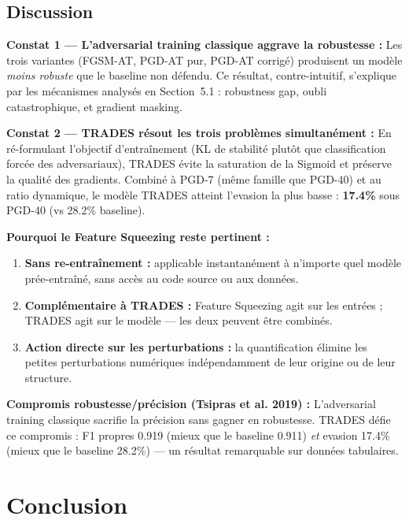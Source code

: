 \documentclass[11pt,a4paper]{article}
\begin{document}
\subsection{Discussion}

\textbf{Constat 1 --- L'adversarial training classique aggrave la robustesse :}
Les trois variantes (FGSM-AT, PGD-AT pur, PGD-AT corrig\'e) produisent un mod\`ele
\emph{moins robuste} que le baseline non d\'efendu.
Ce r\'esultat, contre-intuitif, s'explique par les m\'ecanismes analys\'es en Section~5.1 :
robustness gap, oubli catastrophique, et gradient masking.

\textbf{Constat 2 --- TRADES r\'esout les trois probl\`emes simultan\'ement :}
En r\'e-formulant l'objectif d'entra\^inement (KL de stabilit\'e plut\^ot que classification
forc\'ee des adversariaux), TRADES \'evite la saturation de la Sigmoid et pr\'eserve la qualit\'e
des gradients. Combin\'e \`a PGD-7 (m\^eme famille que PGD-40) et au ratio dynamique, le mod\`ele
TRADES atteint l'evasion la plus basse : \textbf{17.4\%} sous PGD-40 (vs 28.2\% baseline).

\textbf{Pourquoi le Feature Squeezing reste pertinent :}

\begin{enumerate}[leftmargin=1.5em]
    \item \textbf{Sans re-entra\^inement :} applicable instantan\'ement \`a n'importe quel mod\`ele
    pr\'ee-entra\^in\'e, sans acc\`es au code source ou aux donn\'ees.
    \item \textbf{Compl\'ementaire \`a TRADES :} Feature Squeezing agit sur les entr\'ees ;
    TRADES agit sur le mod\`ele --- les deux peuvent \^etre combin\'es.
    \item \textbf{Action directe sur les perturbations :} la quantification \'elimine les petites
    perturbations num\'eriques ind\'ependamment de leur origine ou de leur structure.
\end{enumerate}

\textbf{Compromis robustesse/pr\'ecision (Tsipras et al. 2019) :}
L'adversarial training classique sacrifie la pr\'ecision sans gagner en robustesse.
TRADES d\'efie ce compromis : F1 propres 0.919 (mieux que le baseline 0.911) \emph{et}
evasion 17.4\% (mieux que le baseline 28.2\%) --- un r\'esultat remarquable sur donn\'ees tabulaires.

\section{Conclusion}
\end{document}
